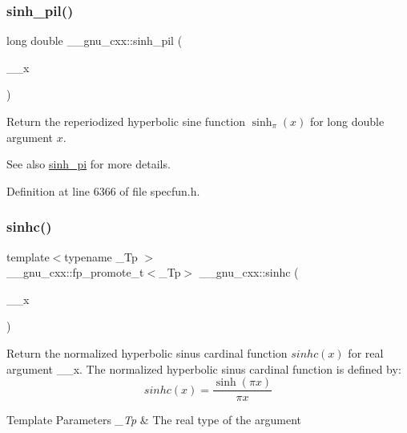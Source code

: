 \subsubsection{\texorpdfstring{sinh\+\_\+pil()}{sinh\_pil()}}
{\footnotesize\ttfamily long double \+\_\+\+\_\+gnu\+\_\+cxx\+::sinh\+\_\+pil (\begin{DoxyParamCaption}\item[{long double}]{\+\_\+\+\_\+x }\end{DoxyParamCaption})\hspace{0.3cm}{\ttfamily [inline]}}

Return the reperiodized hyperbolic sine function $ \sinh_\pi(x) $ for {\ttfamily long double} argument $ x $.

\begin{DoxySeeAlso}{See also}
\hyperlink{group__gnu__math__spec__func_gade43453b87b6b38c05b3fcce40870542}{sinh\+\_\+pi} for more details. 
\end{DoxySeeAlso}


Definition at line 6366 of file specfun.\+h.

\mbox{\label{group__gnu__math__spec__func_gaf2f02e4143e7beb97352cef4b7fcb663}} 
\subsubsection{\texorpdfstring{sinhc()}{sinhc()}}
{\footnotesize\ttfamily template$<$typename \+\_\+\+Tp $>$ \\
\+\_\+\+\_\+gnu\+\_\+cxx\+::fp\+\_\+promote\+\_\+t$<$\+\_\+\+Tp$>$ \+\_\+\+\_\+gnu\+\_\+cxx\+::sinhc (\begin{DoxyParamCaption}\item[{\+\_\+\+Tp}]{\+\_\+\+\_\+x }\end{DoxyParamCaption})\hspace{0.3cm}{\ttfamily [inline]}}

Return the normalized hyperbolic sinus cardinal function $ sinhc(x) $ for real argument {\ttfamily \+\_\+\+\_\+x}. The normalized hyperbolic sinus cardinal function is defined by\+: \[ sinhc(x) = \frac{\sinh(\pi x)}{\pi x} \]


\begin{DoxyTemplParams}{Template Parameters}
{\em \+\_\+\+Tp} & The real type of the argument \\
\hline
\end{DoxyTemplParams}

